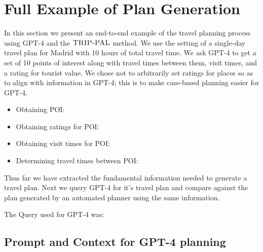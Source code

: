 \documentclass[doubleblind]{ecai}
\newcommand{\gpt}{{\sc GPT-4}\xspace}
\newcommand{\approach}{\ensuremath{\textsc{TRIP-PAL}}\xspace}
\begin{document}



\section {Full Example of Plan Generation}

In this section we present an end-to-end example of the travel planning process using \gpt and the \approach method.
We use the setting of a single-day travel plan for Madrid with 10 hours of total travel time. We ask \gpt to get a set of 10 points of interest along with travel times between them, visit times, and a rating for tourist value. We chose not to arbitrarily set ratings for places so as to align with information in \gpt; this is to make case-based planning easier for \gpt. 

\begin{itemize}

    \item Obtaining POI: 
    \item Obtaining ratings for POI: 
    \item Obtaining visit times for POI: 
    \item Determining travel times between POI: 
    
\end{itemize}

Thus far we have extracted the fundamental information needed to generate a travel plan. Next we query \gpt for it's travel plan and compare against the plan generated by an automated planner using the same information. 

The Query used for \gpt was:\textit{}



\subsection{Prompt and Context for \gpt planning}
\end{document}
